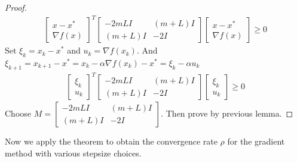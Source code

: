 \documentclass[11pt,a4paper]{article}
\begin{document}
\begin{proof}
\begin{equation}
    \begin{aligned}
        \begin{bmatrix}
            x-x^*\\
            \nabla f(x)
        \end{bmatrix}^T
        \begin{bmatrix}
            -2mLI&	(m+L)I\\
            (m+L)I	&-2I
        \end{bmatrix}
        \begin{bmatrix}
            x-x^*\\
            \nabla f(x)
        \end{bmatrix}\geq 0
    \end{aligned}
    \nonumber
\end{equation}
Set $\xi_k=x_k-x^*$ and $u_k=\nabla f(x_k)$. And $\xi_{k+1}=x_{k+1}-x^*=x_k-\alpha \nabla f(x_k)-x^*=\xi_k-\alpha u_k$
\begin{equation}
    \begin{aligned}
        \begin{bmatrix}
            \xi_k\\
            u_k
        \end{bmatrix}^T
        \begin{bmatrix}
            -2mLI&	(m+L)I\\
            (m+L)I	&-2I
        \end{bmatrix}
        \begin{bmatrix}
            \xi_k\\
            u_k
        \end{bmatrix}\geq 0
    \end{aligned}
    \nonumber
\end{equation}
Choose $M=\begin{bmatrix}
    -2mLI&	(m+L)I\\
    (m+L)I	&-2I
\end{bmatrix}$. Then prove by previous lemma.
\end{proof}

Now we apply the theorem to obtain the convergence rate $\rho$ for the gradient method with various stepsize choices.
\end{document}
